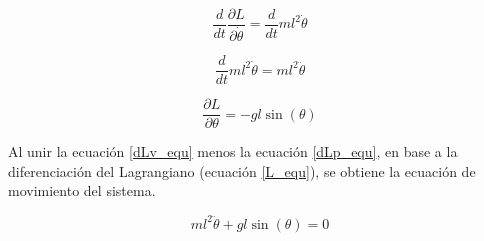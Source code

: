 \begin{large}
\begin{equation*}
\dfrac{d}{dt} \dfrac{\partial L}{\partial \dot{\theta}} = \dfrac{d}{dt} ml^2\dot{\theta}
\end{equation*}
\end{large}
\begin{large}
\begin{equation} \label{dLv_equ}
\dfrac{d}{dt} ml^2\dot{\theta} = ml^2\ddot{\theta}
\end{equation}
\end{large}
\begin{large}
\begin{equation} \label{dLp_equ}
\dfrac{\partial L}{\partial\theta} = -gl\sin(\theta)
\end{equation}
\end{large}
Al unir la ecuación \ref{dLv_equ} menos la ecuación \ref{dLp_equ}, en base a la diferenciación del Lagrangiano (ecuación \ref{L_equ}), se obtiene la ecuación de movimiento del sistema.
\begin{large}
\begin{equation}
ml^2\ddot{\theta} + gl\sin(\theta) = 0
\end{equation}
\end{large}
